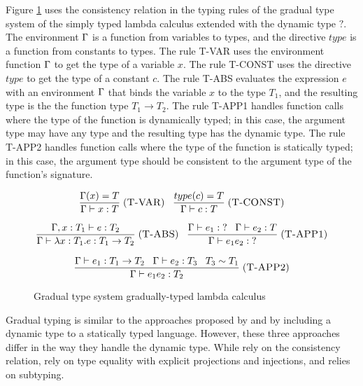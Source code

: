 Figure \ref{fig:gts} uses the consistency relation in the typing rules
of the gradual type system of the simply typed lambda calculus extended
with the dynamic type $?$.
The environment $\Gamma$ is a function from variables to types, and
the directive $type$ is a function from constants to types.
The rule \textsc{T-VAR} uses the environment function $\Gamma$ to get the
type of a variable $x$.
The rule \textsc{T-CONST} uses the directive $type$ to get the type of
a constant $c$.
The rule \textsc{T-ABS} evaluates the expression $e$ with an environment
$\Gamma$ that binds the variable $x$ to the type $T_{1}$, and the resulting
type is the the function type $T_{1} \rightarrow T_{2}$.
The rule \textsc{T-APP1} handles function calls where the type of the
function is dynamically typed; in this case, the argument type may have
any type and the resulting type has the dynamic type.
The rule \textsc{T-APP2} handles function calls where the type of the
function is statically typed; in this case, the argument type should
be consistent to the argument type of the function's signature.

\begin{figure}[!ht]
\dstart
$$
\begin{matrix}
\dfrac{\Gamma(x) = T}
      {\Gamma \vdash x:T} \; (\textsc{T-VAR})
\;\;\;
\dfrac{type(c) = T}
      {\Gamma \vdash c:T} \; (\textsc{T-CONST})
\\ \\
\dfrac{\Gamma, x:T_{1} \vdash e:T_{2}}
      {\Gamma \vdash \lambda x:T_{1}.e:T_{1} \rightarrow T_{2}} \; (\textsc{T-ABS})
\;\;\;
\dfrac{\Gamma \vdash e_{1}:\;? \;\;\;
       \Gamma \vdash e_{2}:T}
      {\Gamma \vdash e_{1} e_{2}:\;?} \; (\textsc{T-APP1})
\\ \\
\dfrac{\Gamma \vdash e_{1}:T_{1} \rightarrow T_{2} \;\;\;
       \Gamma \vdash e_{2}:T_{3} \;\;\;
       T_{3} \sim T_{1}}
      {\Gamma \vdash e_{1} e_{2}:T_{2}} \; (\textsc{T-APP2})
\end{matrix}
$$
\dend
\caption{Gradual type system gradually-typed lambda calculus}
\label{fig:gts}
\end{figure}

Gradual typing is similar to the approaches proposed by
\citet{abadi1989dts} and \citet{thatte1990qst} by including a
dynamic type to a statically typed language.
However, these three approaches differ in the way they handle the
dynamic type.
While \citet{siek2006gradual} rely on the consistency relation,
\citet{abadi1989dts} rely on type equality with explicit projections
and injections, and \citet{thatte1990qst} relies on subtyping.

